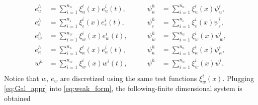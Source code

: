 \documentclass{ifacconf}
\begin{document}
\begin{equation}\label{eq:Gal_appr}
\begin{aligned}
	e_u^h &= \sum_{i=1}^{n_u} \xi_u^i(x) e_u^i(t), \\
	e_\varepsilon^h &= \sum_{i=1}^{n_\varepsilon} \xi_\varepsilon^i(x) e_\varepsilon^i(t), \\
	e_w^h &= \sum_{i=1}^{n_w} \xi_w^i(x) e_w^i(t), \\
	e_\kappa^h &= \sum_{i=1}^{n_\kappa} \xi_\kappa^i(x) e_\kappa^i(t), \\
	w^h &= \sum_{i=1}^{n_w} \xi_w^i(x) w^i(t), \\
\end{aligned} \qquad 
\begin{aligned}
	\psi_u^h &= \sum_{i=1}^{n_u} \xi_u^i(x) \psi_u^i, \\
	\psi_\varepsilon^h &= \sum_{i=1}^{n_\varepsilon} \xi_\varepsilon^i(x) \psi_\varepsilon^i, \\
	\psi_w^h &= \sum_{i=1}^{n_w} \xi_w^i(x) \psi_w^i, \\
    \psi_\kappa^h &= \sum_{i=1}^{n_\kappa} \xi_\kappa^i(x) \psi_\kappa^i, \\
	\psi^h &= \sum_{i=1}^{n_w} \xi_w^i(x) \psi^i. \\
\end{aligned}
\end{equation}
Notice that $w, \, e_w$ are discretized using the same test functions 
$\xi_w^i(x)$. Plugging \eqref{eq:Gal_appr} into \eqref{eq:weak_form}, the following-finite dimensional system is obtained
\end{document}
